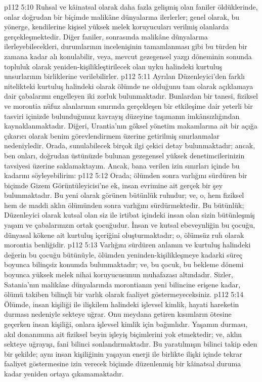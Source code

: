 \vs p112 5:10 Ruhsal ve kâinatsal olarak daha fazla gelişmiş olan faniler öldüklerinde, onlar doğrudan bir biçimde malikâne dünyalarına ilerlerler; genel olarak, bu yönerge, kendilerine kişisel yüksek melek koruyucuları verilmiş olanlarda gerçekleşmektedir. Diğer faniler, sonrasında malikâne dünyalarına ilerleyebilecekleri, durumlarının incelenişinin tamamlanması gibi bu türden bir zamana kadar alı konulabilir, veya, mevcut gezegensel yazgı döneminin sonunda topluluk olarak yeniden\hyp{}kişilikleştirilecek olan uyku halindeki kurtuluş unsurlarının birliklerine verilebilirler.
\vs p112 5:11 Ayrılan Düzenleyici’den farklı nitelikteki kurtuluş halindeki  olarak ölümde  ne olduğunu tam olarak açıklamaya dair çabalarımı engelleyen iki zorluk bulunmaktadır. Bunlardan bir tanesi, fiziksel ve morontia nüfuz alanlarının sınırında gerçekleşen bir etkileşime dair yeterli bir tasviri içinizde bulunduğunuz kavrayış düzeyine taşımanın imkânsızlığından kaynaklanmaktadır. Diğeri, Urantia’nın göksel yönetim makamlarına ait bir açığa çıkarıcı olarak benim görevlendirmem üzerine getirilmiş sınırlanmalar nedeniyledir. Orada, sunulabilecek birçok ilgi çekici detay bulunmaktadır; ancak, ben onları, doğrudan üstünüzde bulunan gezegensel yüksek denetimcilerinizin tavsiyesi üzerine saklamaktayım. Ancak, bana verilen izin sınırları içinde bu kadarını söyleyebilirim:
\vs p112 5:12 Orada; ölümden sonra varlığını sürdüren bir biçimde Gizem Görüntüleyicisi’ne ek, insan evrimine ait gerçek bir şey bulunmaktadır. Bu yeni olarak görünen bütünlük ruhudur; ve, o, hem fiziksel hem de maddi aklın ölümünden sonra varlığını sürdürmektedir. Bu bütünlük; Düzenleyici olarak kutsal olan siz ile irtibat içindeki insan olan sizin bütünleşmiş yaşam ve çabalarınızın ortak çocuğudur. İnsan ve kutsal ebeveynliğin bu çocuğu, dünyasal kökene ait kurtuluş içeriğini oluşturmaktadır; o, ölümsüz ruh olarak morontia benliğidir.
\vs p112 5:13 Varlığını sürdüren anlamın ve kurtuluş halindeki değerin bu çocuğu bütünüyle, ölümden yeninden\hyp{}kişilikleşmeye kadarki süreç boyunca bilinçsiz konumda bulunmaktadır; ve, bu çocuk, bu bekleme dönemi boyunca yüksek melek nihai koruyucusunun muhafazası altındadır. Sizler, Satania’nın malikâne dünyalarında morontianın yeni bilincine erişene kadar, ölümü takiben bilinçli bir varlık olarak faaliyet göstermeyeceksiniz.
\vs p112 5:14 Ölümde, insan kişiliği ile ilişkilem halindeki işlevsel kimlik, hayati hareketin durması nedeniyle sekteye uğrar. Onu meydana getiren kısımların ötesine geçerken insan kişiliği, onlara işlevsel kimlik için bağımlıdır. Yaşamın durması, akıl donanımına ait fiziksel beyin işleyiş biçimlerini yok etmektedir; ve, aklın sekteye uğrayışı, fani bilinci sonlandırmaktadır. Bu yaratılmışın bilinci takip eden bir şekilde; aynı insan kişiliğinin yaşayan enerji ile birlikte ilişki içinde tekrar faaliyet göstermesine izin verecek biçimde düzenlenmiş bir kâinatsal duruma kadar yeniden ortaya çıkamamaktadır.
